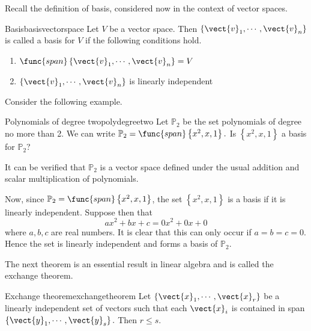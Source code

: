 Recall the definition of basis, considered now in the context of vector spaces.

\begin{definition}{Basis}{basisvectorspace}
Let $V$ be a vector space. Then $\{\vect{v}_{1},\cdots ,\vect{v}_{n}\}$ is called a basis for $V$ if the following conditions hold.
\begin{enumerate}
\item
$\func{span}\left\{ \vect{v}_{1},\cdots ,\vect{v}_{n}\right\} = V$
\item
$\{\vect{v}_{1},\cdots ,\vect{v}_{n}\}$ is linearly independent
\end{enumerate}
\end{definition}

Consider the following example.

\begin{example}{Polynomials of degree two}{polydegreetwo}
Let $\mathbb{P}_2$ be the set polynomials of degree no more than 2. We can write
$\mathbb{P}_2=\func{span}\left\{ x^{2}, x, 1\right\} .$ Is $\left\{ x^{2}, x, 1\right\} $ a
basis for $\mathbb{P}_2$?
\end{example}

\begin{solution}
It can be verified that $\mathbb{P}_2$ is a vector space defined under the usual addition and scalar multiplication of polynomials. 

Now, since $\mathbb{P}_2=\func{span}\left\{ x^{2},x, 1\right\}$, the set  $\left\{ x^{2}, x, 1\right\} $ is a basis if it is linearly independent. Suppose then that 
\begin{equation*}
ax^{2}+bx+c=0x^2 + 0x + 0 
\end{equation*}
where $a,b,c$ are real numbers. It is clear that this can only occur if $a=b=c=0$. Hence the set is linearly independent and forms a basis of $\mathbb{P}_2$.
\end{solution}

The next theorem is an essential result in linear algebra and is called the exchange theorem.

\begin{theorem}{Exchange theorem}{exchangetheorem}
Let $\left\{ \vect{x}_{1},\cdots ,\vect{x}_{r}\right\} $
be a linearly independent set of vectors such that each $\vect{x}_{i}$ is
contained in span$\left\{ \vect{y}_{1},\cdots ,\vect{y}_{s}\right\} .$ Then $
r\leq s.$
\end{theorem}

